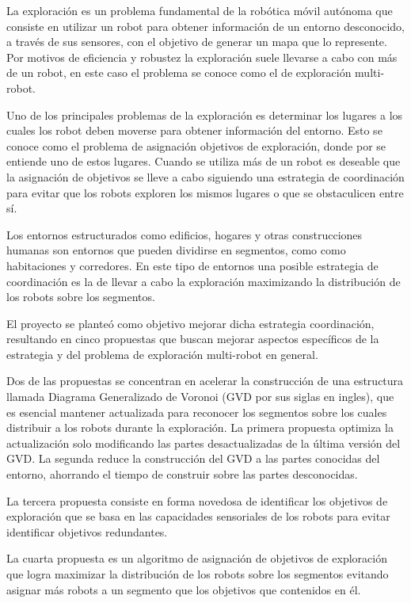 La exploración es un problema fundamental de la robótica móvil autónoma que
consiste en utilizar un robot para obtener información de un entorno
desconocido, a través de sus sensores, con el objetivo de generar un mapa que lo
represente. Por motivos de eficiencia y robustez la exploración suele llevarse
a cabo con más de un robot, en este caso el problema se conoce como el de
exploración multi-robot.

Uno de los principales problemas de la exploración es determinar los lugares a
los cuales los robot deben moverse para obtener información del entorno. Esto
se conoce como el problema de asignación objetivos de exploración, donde por
 se entiende uno de estos lugares. Cuando se
utiliza más de un robot es deseable que la asignación de objetivos se lleve
a cabo siguiendo una estrategia de coordinación para evitar que los robots
exploren los mismos lugares o que se obstaculicen entre sí.

Los entornos estructurados como edificios, hogares y otras construcciones
humanas son entornos que pueden dividirse en segmentos, como como habitaciones
y corredores. En este tipo de entornos una posible estrategia de coordinación
es la de llevar a cabo la exploración maximizando la distribución de los
robots sobre los segmentos. 

El proyecto se planteó como objetivo mejorar dicha estrategia coordinación,
resultando en cinco propuestas que buscan mejorar aspectos específicos de la
estrategia y del problema de exploración multi-robot en general.

Dos de las propuestas se concentran en acelerar la construcción de una
estructura llamada Diagrama Generalizado de Voronoi (GVD por sus siglas en
ingles), que es esencial mantener actualizada para reconocer los segmentos
sobre los cuales distribuir a los robots durante la exploración. La primera
propuesta optimiza la actualización solo modificando las partes desactualizadas 
de la última versión del GVD. La segunda reduce la construcción del GVD a las
partes conocidas del entorno, ahorrando el tiempo de construir sobre las
partes desconocidas.

La tercera propuesta consiste en forma novedosa de identificar los objetivos de exploración
que se basa en las capacidades sensoriales de los robots para evitar
identificar objetivos redundantes.

La cuarta propuesta es un algoritmo de asignación de objetivos de exploración
que logra maximizar la distribución de los robots sobre los segmentos evitando
asignar más robots a un segmento que los objetivos que contenidos en él.

